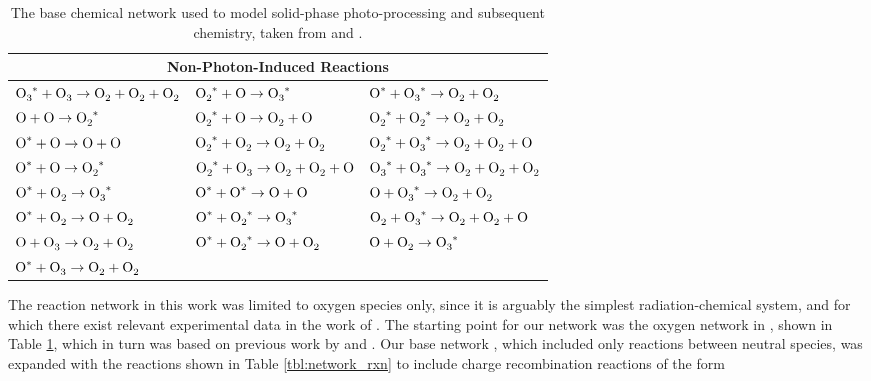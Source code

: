 \documentclass[journal=aesccq,manuscript=article,layout=twocolumn]{achemso}
\begin{document}
\begin{table}[htbp]
\centering
\footnotesize
\caption{The base chemical network used to model solid-phase  photo-processing and subsequent chemistry, taken from \citet{mullikin_new_2021} and \citet{shingledecker_simulating_2019}.}
\label{tab:onetwork}
\begin{tabular}{lll}
\toprule
\multicolumn{3}{c}{Non-Photon-Induced Reactions} \\
\midrule
$\ce{O3^*} + \ce{O3} \rightarrow \ce{O2} + \ce{O2} + \ce{O2}$ &
$\ce{O2^*} + \ce{O} \rightarrow \ce{O3^*}$ &
$\ce{O^*} + \ce{O3^*} \rightarrow \ce{O2} + \ce{O2}$ \\

$\ce{O} + \ce{O} \rightarrow \ce{O2^*}$ &
$\ce{O2^*} + \ce{O} \rightarrow \ce{O2} + \ce{O}$ &
$\ce{O2^*} + \ce{O2^*} \rightarrow \ce{O2} + \ce{O2}$ \\

$\ce{O^*} + \ce{O} \rightarrow \ce{O} + \ce{O}$ &
$\ce{O2^*} + \ce{O2} \rightarrow \ce{O2} + \ce{O2}$ &
$\ce{O2^*} + \ce{O3^*} \rightarrow \ce{O2} + \ce{O2} + \ce{O}$ \\

$\ce{O^*} + \ce{O} \rightarrow \ce{O2^*}$ &
$\ce{O2^*} + \ce{O3} \rightarrow \ce{O2} + \ce{O2} + \ce{O}$ &
$\ce{O3^*} + \ce{O3^*} \rightarrow \ce{O2} + \ce{O2} + \ce{O2}$ \\

$\ce{O^*} + \ce{O2} \rightarrow \ce{O3^*}$ &
$\ce{O^*} + \ce{O^*} \rightarrow \ce{O} + \ce{O}$ &
$\ce{O} + \ce{O3^*} \rightarrow \ce{O2} + \ce{O2}$ \\

$\ce{O^*} + \ce{O2} \rightarrow \ce{O} + \ce{O2}$ &
$\ce{O^*} + \ce{O2^*} \rightarrow \ce{O3^*}$ &
$\ce{O2} + \ce{O3^*} \rightarrow \ce{O2} + \ce{O2} + \ce{O}$ \\

$\ce{O} + \ce{O3} \rightarrow \ce{O2} + \ce{O2}$ &
$\ce{O^*} + \ce{O2^*} \rightarrow \ce{O} + \ce{O2}$ &
$\ce{O} + \ce{O2} \rightarrow \ce{O3^*}$ \\

$\ce{O^*} + \ce{O3} \rightarrow \ce{O2} + \ce{O2}$ & & \\
\bottomrule
\end{tabular}
\end{table}

The reaction network in this work was limited to oxygen species only, since it is arguably the simplest radiation-chemical system, and for which there exist relevant experimental data in the work of \citet{gerakines_ultraviolet_1996}. The starting point for our network was the oxygen network in \citet{mullikin_new_2021}, shown in Table \ref{tab:onetwork}, which in turn was based on previous work by \citet{shingledecker_simulating_2019} and \citet{shingledecker_new_2017}. Our base network \citep{mullikin_new_2021}, which included only reactions between neutral species, was expanded with the reactions shown in Table \ref{tbl:network_rxn} to include charge recombination reactions of the form
\end{document}
